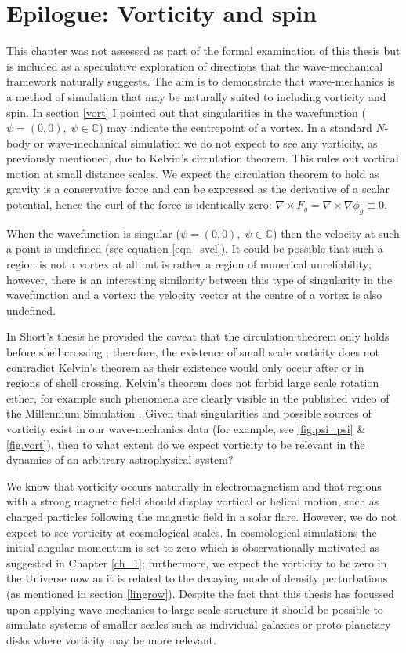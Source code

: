 %
\chapter{Epilogue: Vorticity and spin}
\label{ch_7}
This chapter was not assessed as part of the formal examination of this thesis but is included as a speculative exploration of directions that the wave-mechanical framework naturally suggests. The aim is to demonstrate that wave-mechanics is a method of simulation that may be naturally suited to including vorticity and spin. In section \ref{vort} I pointed out that singularities in the wavefunction ($\psi = (0,0), \;\psi\in\mathbb{C}$) may indicate the centrepoint of a vortex. In a standard $N$-body or wave-mechanical simulation we do not expect to see any vorticity, as previously mentioned, due to Kelvin's circulation theorem. This rules out vortical motion at small distance scales. We expect the circulation theorem to hold as gravity is a conservative force and can be expressed as the derivative of a scalar potential, hence the curl of the force is identically zero: $\nabla\times F_g = \nabla\times\nabla\phi_g \equiv 0$.

When the wavefunction is singular ($\psi = (0,0), \;\psi\in\mathbb{C}$) then the velocity at such a point is undefined (see equation \ref{eqn_svel}). It could be possible that such a region is not a vortex at all but is rather a region of numerical unreliability; however, there is an interesting similarity between this type of singularity in the wavefunction and a vortex: the velocity vector at the centre of a vortex is also undefined.

In Short's thesis he provided the caveat that the circulation theorem only holds before shell crossing \citep{bib_short}; therefore, the existence of small scale vorticity does not contradict Kelvin's theorem as their existence would only occur after or in regions of shell crossing. Kelvin's theorem does not forbid large scale rotation either, for example such phenomena are clearly visible in the published video of the Millennium Simulation \citep{bib_mil}. Given that singularities and possible sources of vorticity exist in our wave-mechanics data (for example, see \ref{fig.psi_psi} \& \ref{fig.vort}), then to what extent do we expect vorticity to be relevant in the dynamics of an arbitrary astrophysical system?

We know that vorticity occurs naturally in electromagnetism and that regions with a strong magnetic field should display vortical or helical motion, such as charged particles following the magnetic field in a solar flare. However, we do not expect to see vorticity at cosmological scales. In cosmological simulations the initial angular momentum is set to zero which is observationally motivated as suggested in Chapter \ref{ch_1}; furthermore, we expect the vorticity to be zero in the Universe now as it is related to the decaying mode of density perturbations (as mentioned in section \ref{lingrow}). Despite the fact that this thesis has focussed upon applying wave-mechanics to large scale structure it should be possible to simulate systems of smaller scales such as individual galaxies or proto-planetary disks where vorticity may be more relevant.

